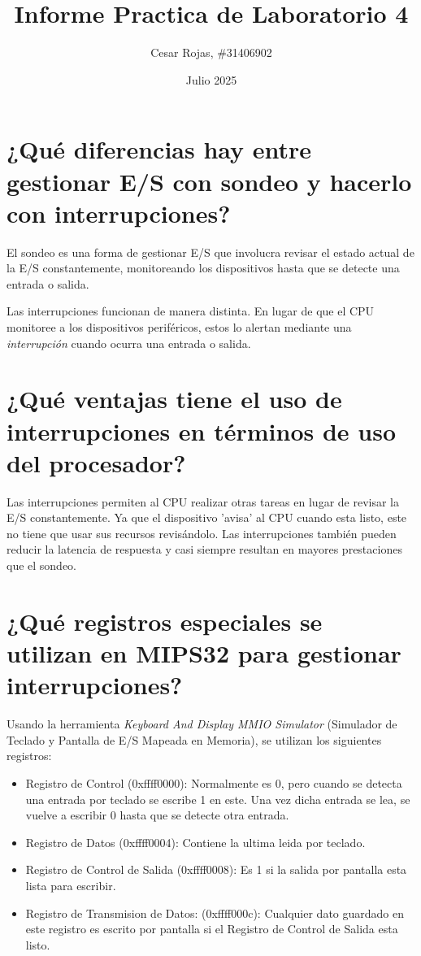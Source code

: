 \documentclass[titlepage]{article}
\title{Informe Practica de Laboratorio 4}
\author{Cesar Rojas, \#31406902}
\date{Julio 2025}
\begin{document}
\maketitle

\section*{¿Qué diferencias hay entre gestionar E/S con sondeo y hacerlo con interrupciones?}

El sondeo es una forma de gestionar E/S que involucra revisar el estado actual de la E/S constantemente, monitoreando los dispositivos hasta que se detecte una entrada o salida.

Las interrupciones funcionan de manera distinta. En lugar de que el CPU monitoree a los dispositivos periféricos, estos lo alertan mediante una \emph{interrupción} cuando ocurra una entrada o salida.

\section*{¿Qué ventajas tiene el uso de interrupciones en términos de uso del procesador?}

Las interrupciones permiten al CPU realizar otras tareas en lugar de revisar la E/S constantemente. Ya que el dispositivo 'avisa' al CPU cuando esta listo, este no tiene que usar sus recursos revisándolo. Las interrupciones también pueden reducir la latencia de respuesta y casi siempre resultan en mayores prestaciones que el sondeo.

\section*{¿Qué registros especiales se utilizan en MIPS32 para gestionar interrupciones?}

Usando la herramienta \emph{Keyboard And Display MMIO Simulator} (Simulador de Teclado y Pantalla de E/S Mapeada en Memoria), se utilizan los siguientes registros:

\begin{itemize}
    \item Registro de Control (0xffff0000): Normalmente es 0, pero cuando se detecta una entrada por teclado se escribe 1 en este. Una vez dicha entrada se lea, se vuelve a escribir 0 hasta que se detecte otra entrada.
    \item Registro de Datos (0xffff0004): Contiene la ultima leida por teclado.
    \item Registro de Control de Salida (0xffff0008): Es 1 si la salida por pantalla esta lista para escribir.
    \item Registro de Transmision de Datos: (0xffff000c): Cualquier dato guardado en este registro es escrito por pantalla si el Registro de Control de Salida esta listo.
\end{itemize}
\end{document}
